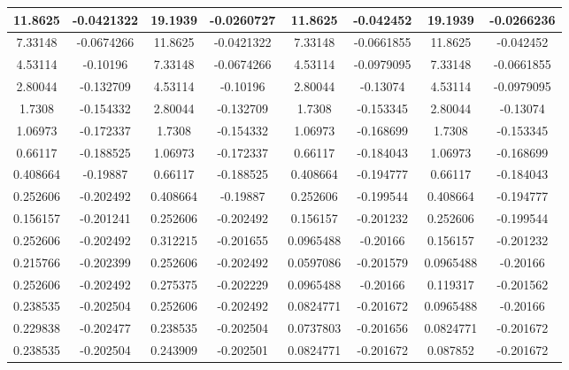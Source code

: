 \begin{table}[H]
{\begin{tabular}{|c|c|c|c|c|c|c|c|}
11.8625    & -0.0421322    & 19.1939    & -0.0260727    & 11.8625    & -0.042452     & 19.1939    & -0.0266236    \\ \hline
7.33148    & -0.0674266    & 11.8625    & -0.0421322    & 7.33148    & -0.0661855    & 11.8625    & -0.042452     \\ \hline
4.53114    & -0.10196      & 7.33148    & -0.0674266    & 4.53114    & -0.0979095    & 7.33148    & -0.0661855    \\ \hline
2.80044    & -0.132709     & 4.53114    & -0.10196      & 2.80044    & -0.13074      & 4.53114    & -0.0979095    \\ \hline
1.7308     & -0.154332     & 2.80044    & -0.132709     & 1.7308     & -0.153345     & 2.80044    & -0.13074      \\ \hline
1.06973    & -0.172337     & 1.7308     & -0.154332     & 1.06973    & -0.168699     & 1.7308     & -0.153345     \\ \hline
0.66117    & -0.188525     & 1.06973    & -0.172337     & 0.66117    & -0.184043     & 1.06973    & -0.168699     \\ \hline
0.408664   & -0.19887      & 0.66117    & -0.188525     & 0.408664   & -0.194777     & 0.66117    & -0.184043     \\ \hline
0.252606   & -0.202492     & 0.408664   & -0.19887      & 0.252606   & -0.199544     & 0.408664   & -0.194777     \\ \hline
0.156157   & -0.201241     & 0.252606   & -0.202492     & 0.156157   & -0.201232     & 0.252606   & -0.199544     \\ \hline
0.252606   & -0.202492     & 0.312215   & -0.201655     & 0.0965488  & -0.20166      & 0.156157   & -0.201232     \\ \hline
0.215766   & -0.202399     & 0.252606   & -0.202492     & 0.0597086  & -0.201579     & 0.0965488  & -0.20166      \\ \hline
0.252606   & -0.202492     & 0.275375   & -0.202229     & 0.0965488  & -0.20166      & 0.119317   & -0.201562     \\ \hline
0.238535   & -0.202504     & 0.252606   & -0.202492     & 0.0824771  & -0.201672     & 0.0965488  & -0.20166      \\ \hline
0.229838   & -0.202477     & 0.238535   & -0.202504     & 0.0737803  & -0.201656     & 0.0824771  & -0.201672     \\ \hline
0.238535   & -0.202504     & 0.243909   & -0.202501     & 0.0824771  & -0.201672     & 0.087852   & -0.201672     \\ \hline

\end{tabular}}
\end{table}
